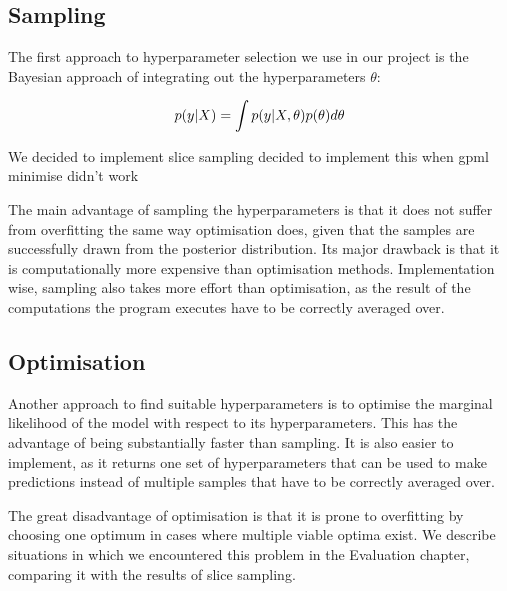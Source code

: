\documentclass[a4paper,12pt,twoside,openright]{report}
\begin{document}
\subsection{Sampling}
The first approach to hyperparameter selection we use in our project is the Bayesian approach of integrating out the hyperparameters $\theta$:

\begin{equation}
p(y|X) = \int p(y|X,\theta)p(\theta)d\theta\\
\end{equation}

We decided to implement slice sampling
decided to implement this when gpml minimise didn't work

The main advantage of sampling the hyperparameters is that it does not suffer from overfitting the same way optimisation does, given that the samples are successfully drawn from the posterior distribution. Its major drawback is that it is computationally more expensive than optimisation methods. Implementation wise, sampling also takes more effort than optimisation, as the result of the computations the program executes have to be correctly averaged over.







\subsection{Optimisation}
Another approach to find suitable hyperparameters is to optimise the marginal likelihood of the model with respect to its hyperparameters. This has the advantage of being substantially faster than sampling. It is also easier to implement, as it returns one set of hyperparameters that can be used to make predictions instead of multiple samples that have to be correctly averaged over.

The great disadvantage of optimisation is that it is prone to overfitting by choosing one optimum in cases where multiple viable optima exist. We describe situations in which we encountered this problem in the Evaluation chapter, comparing it with the results of slice sampling.
\end{document}

